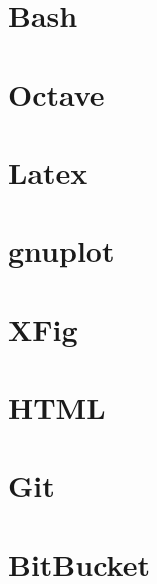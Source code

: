 \documentclass{article}
\author{}
\date{}
\begin{document}
\maketitle

\section{Bash}
\section{Octave}
\section{Latex}
\section{gnuplot}
\section{XFig}
\section{HTML}
\section{Git}
\section{BitBucket}
\end{document}
